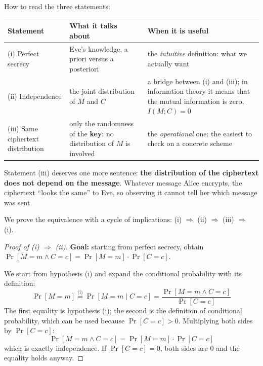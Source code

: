 How to read the three statements:

\begin{table}[H]
  \centering
  \small
  \begin{tabularx}{\textwidth}{@{}lXX@{}}
    \toprule
    \textbf{Statement} & \textbf{What it talks about} & \textbf{When it is useful} \\
    \midrule
    (i) Perfect secrecy & Eve's knowledge, a priori versus a posteriori & the \textit{intuitive} definition: what we actually want \\
    (ii) Independence & the joint distribution of $M$ and $C$ & a bridge between (i) and (iii); in information theory it means that the mutual information is zero, $I(M;C) = 0$ \\
    (iii) Same ciphertext distribution & only the randomness of the \textbf{key}: no distribution of $M$ is involved & the \textit{operational} one: the easiest to check on a concrete scheme \\
    \bottomrule
  \end{tabularx}
\end{table}

Statement (iii) deserves one more sentence: \textbf{the distribution of the ciphertext does not depend on the message}. Whatever message Alice encrypts, the ciphertext ``looks the same'' to Eve, so observing it cannot tell her which message was sent.

We prove the equivalence with a cycle of implications: (i) $\Rightarrow$ (ii) $\Rightarrow$ (iii) $\Rightarrow$ (i).

\begin{proof}[Proof of (i) $\Rightarrow$ (ii)]
  \textbf{Goal:} starting from perfect secrecy, obtain $\Pr[M = m \wedge C = c] = \Pr[M = m] \cdot \Pr[C = c]$.

  We start from hypothesis (i) and expand the conditional probability with its definition:
  \[
    \Pr[M = m] \overset{\text{(i)}}{=} \Pr[M = m \mid C = c] = \frac{\Pr[M = m \wedge C = c]}{\Pr[C = c]}
  \]
  The first equality is hypothesis (i); the second is the definition of conditional probability, which can be used because $\Pr[C = c] > 0$. Multiplying both sides by $\Pr[C = c]$:
  \[
    \Pr[M = m \wedge C = c] = \Pr[M = m] \cdot \Pr[C = c]
  \]
  which is exactly independence. If $\Pr[C = c] = 0$, both sides are $0$ and the equality holds anyway.
\end{proof}

